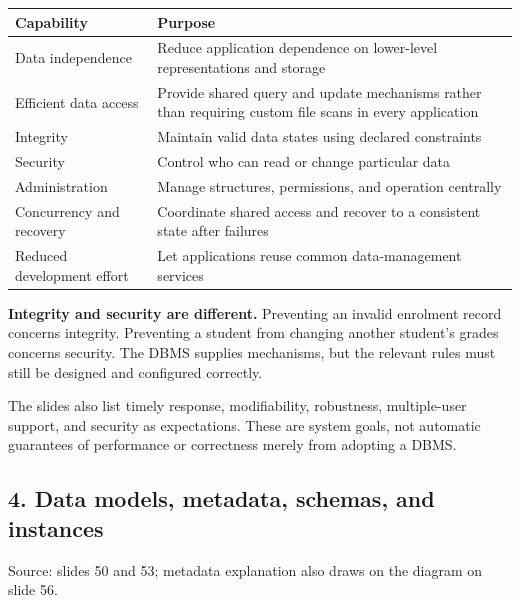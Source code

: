 \begin{longtable}[]{@{}
  >{\raggedright\arraybackslash}p{}
  >{\raggedright\arraybackslash}p{}@{}}
\toprule\noalign{}
\begin{minipage}[b]{\linewidth}\raggedright
Capability
\end{minipage} & \begin{minipage}[b]{\linewidth}\raggedright
Purpose
\end{minipage} \\
\midrule\noalign{}
\endhead
\bottomrule\noalign{}
\endlastfoot
Data independence & Reduce application dependence on lower-level representations and storage \\
Efficient data access & Provide shared query and update mechanisms rather than requiring custom file scans in every application \\
Integrity & Maintain valid data states using declared constraints \\
Security & Control who can read or change particular data \\
Administration & Manage structures, permissions, and operation centrally \\
Concurrency and recovery & Coordinate shared access and recover to a consistent state after failures \\
Reduced development effort & Let applications reuse common data-management services \\
\end{longtable}

\textbf{Integrity and security are different.} Preventing an invalid enrolment record concerns integrity. Preventing a student from changing another student's grades concerns security. The DBMS supplies mechanisms, but the relevant rules must still be designed and configured correctly.

The slides also list timely response, modifiability, robustness, multiple-user support, and security as expectations. These are system goals, not automatic guarantees of performance or correctness merely from adopting a DBMS.

\subsection{4. Data models, metadata, schemas, and instances}\label{01_database_fundamentals_en-data-models-metadata-schemas-and-instances}

Source: slides 50 and 53; metadata explanation also draws on the diagram on slide 56.


